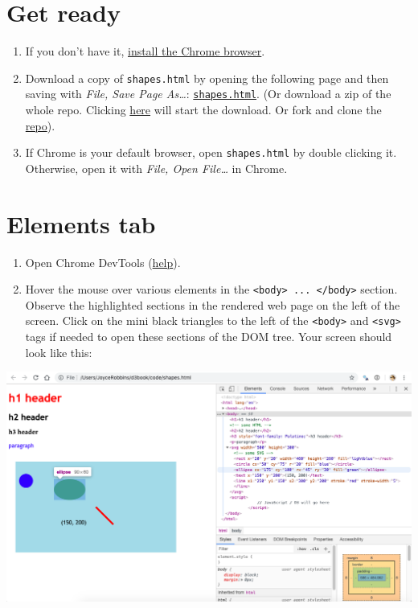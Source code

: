 \documentclass[openany]{book}
\begin{document}
\hypertarget{get-ready}{%
\section{Get ready }\label{get-ready}}

\begin{enumerate}
\def\labelenumi{\arabic{enumi}.}
\item
  If you don't have it, \href{https://www.google.com/chrome/}{install the Chrome browser}.
\item
  Download a copy of \texttt{shapes.html} by opening the following page and then saving with \emph{File, Save Page As\ldots{}}: \href{https://raw.githubusercontent.com/jtr13/d3book/master/code/shapes.html}{\texttt{shapes.html}}. (Or download a zip of the whole repo. Clicking \href{https://github.com/jtr13/d3book/archive/master.zip}{here} will start the download. Or fork and clone the \href{https://github.com/jtr13/d3book}{repo}).
\item
  If Chrome is your default browser, open \texttt{shapes.html} by double clicking it. Otherwise, open it with \emph{File, Open File\ldots{}} in Chrome.
\end{enumerate}

\hypertarget{elements-tab}{%
\section{Elements tab }\label{elements-tab}}

\begin{enumerate}
\def\labelenumi{\arabic{enumi}.}
\item
  Open Chrome DevTools (\href{index.html\#javascript-console}{help}).
\item
  Hover the mouse over various elements in the \texttt{\textless{}body\textgreater{}\ ...\ \textless{}/body\textgreater{}} section. Observe the highlighted sections in the rendered web page on the left of the screen. Click on the mini black triangles to the left of the \texttt{\textless{}body\textgreater{}} and \texttt{\textless{}svg\textgreater{}} tags if needed to open these sections of the DOM tree. Your screen should look like this:
\end{enumerate}

\begin{center}\includegraphics[width=0.8\linewidth]{images/elements} \end{center}
\end{document}
